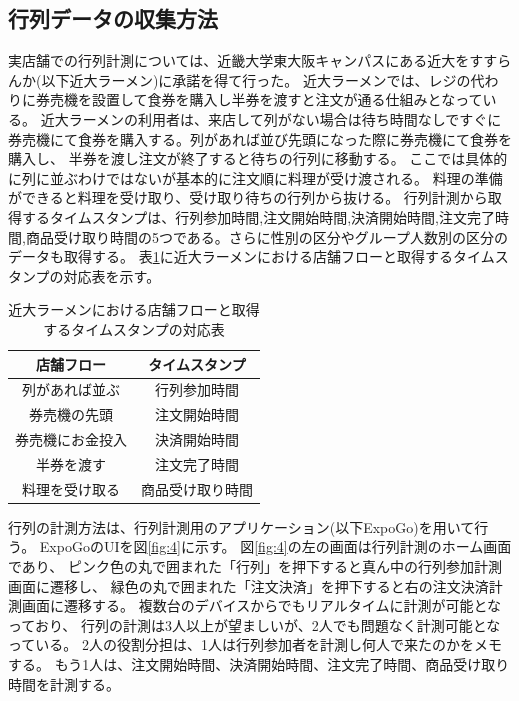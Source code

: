 \documentclass{jsarticle}
\begin{document}
\subsection{行列データの収集方法}
実店舗での行列計測については、近畿大学東大阪キャンパスにある近大をすすらんか(以下近大ラーメン)に承諾を得て行った。
近大ラーメンでは、レジの代わりに券売機を設置して食券を購入し半券を渡すと注文が通る仕組みとなっている。
近大ラーメンの利用者は、来店して列がない場合は待ち時間なしですぐに券売機にて食券を購入する。列があれば並び先頭になった際に券売機にて食券を購入し、
半券を渡し注文が終了すると待ちの行列に移動する。
ここでは具体的に列に並ぶわけではないが基本的に注文順に料理が受け渡される。
料理の準備ができると料理を受け取り、受け取り待ちの行列から抜ける。
行列計測から取得するタイムスタンプは、行列参加時間,注文開始時間,決済開始時間,注文完了時間,商品受け取り時間の5つである。さらに性別の区分やグループ人数別の区分のデータも取得する。
表\ref{table2}に近大ラーメンにおける店舗フローと取得するタイムスタンプの対応表を示す。

\begin{table}[H]
 \begin{center}
   \caption{近大ラーメンにおける店舗フローと取得するタイムスタンプの対応表}
   \begin{tabular}{|c|c|} \hline
店舗フロー      & タイムスタンプ \\ \hline \hline
列があれば並ぶ   & 行列参加時間 \\ \hline
券売機の先頭     & 注文開始時間 \\ \hline
券売機にお金投入  & 決済開始時間 \\ \hline
半券を渡す       & 注文完了時間 \\ \hline
料理を受け取る   & 商品受け取り時間 \\ \hline
  \end{tabular}
 \label{table2}
 \end{center}
\end{table}


行列の計測方法は、行列計測用のアプリケーション(以下ExpoGo)\cite{bibi3}を用いて行う。
ExpoGoのUIを図\ref{fig:4}に示す。
図\ref{fig:4}の左の画面は行列計測のホーム画面であり、
ピンク色の丸で囲まれた「行列」を押下すると真ん中の行列参加計測画面に遷移し、
緑色の丸で囲まれた「注文決済」を押下すると右の注文決済計測画面に遷移する。
複数台のデバイスからでもリアルタイムに計測が可能となっており、
行列の計測は3人以上が望ましいが、2人でも問題なく計測可能となっている。
2人の役割分担は、1人は行列参加者を計測し何人で来たのかをメモする。
もう1人は、注文開始時間、決済開始時間、注文完了時間、商品受け取り時間を計測する。
\end{document}
